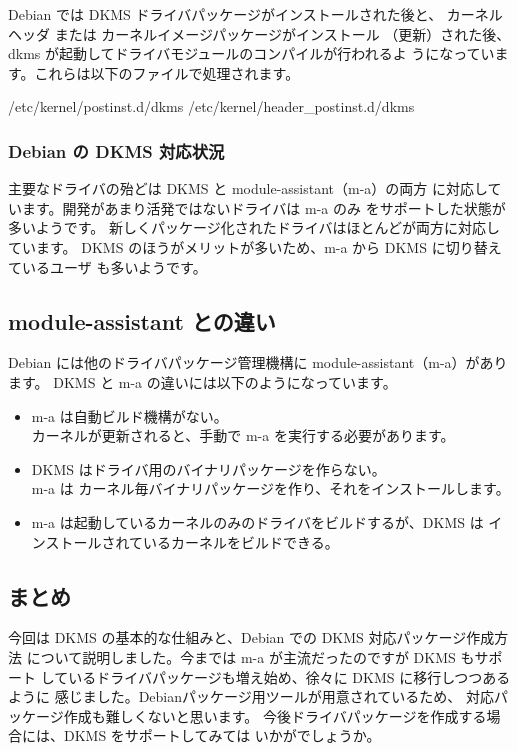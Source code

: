 \documentclass[mingoth,a4paper]{jsarticle}
\begin{document}
Debian では DKMS ドライバパッケージがインストールされた後と、
カーネルヘッダ または カーネルイメージパッケージがインストール
（更新）された後、 dkms が起動してドライバモジュールのコンパイルが行われるよ
うになっています。これらは以下のファイルで処理されます。

\begin{commandline}
/etc/kernel/postinst.d/dkms
/etc/kernel/header_postinst.d/dkms
\end{commandline}

\subsubsection{Debian の DKMS 対応状況}

主要なドライバの殆どは DKMS と module-assistant（m-a）の両方
に対応しています。開発があまり活発ではないドライバは m-a のみ
をサポートした状態が多いようです。
新しくパッケージ化されたドライバはほとんどが両方に対応しています。
DKMS のほうがメリットが多いため、m-a から DKMS に切り替えているユーザ
も多いようです。

\subsection{module-assistant との違い}
Debian には他のドライバパッケージ管理機構に 
module-assistant（m-a）があります。
DKMS と m-a の違いには以下のようになっています。
\begin{itemize}
\item m-a は自動ビルド機構がない。\\
カーネルが更新されると、手動で m-a を実行する必要があります。
\item DKMS はドライバ用のバイナリパッケージを作らない。\\
m-a は カーネル毎バイナリパッケージを作り、それをインストールします。
\item m-a は起動しているカーネルのみのドライバをビルドするが、DKMS は
インストールされているカーネルをビルドできる。
\end{itemize}

\subsection{まとめ}

今回は DKMS の基本的な仕組みと、Debian での DKMS 対応パッケージ作成方法
について説明しました。今までは m-a が主流だったのですが DKMS もサポート
しているドライバパッケージも増え始め、徐々に DKMS に移行しつつあるように
感じました。Debianパッケージ用ツールが用意されているため、
対応パッケージ作成も難しくないと思います。
今後ドライバパッケージを作成する場合には、DKMS をサポートしてみては
いかがでしょうか。
\end{document}
